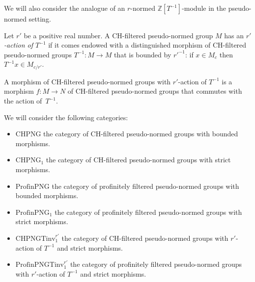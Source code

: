 We will also consider the analogue of an $r$-normed $\mathbb Z[T^{-1}]$-module in the pseudo-normed setting.

\begin{definition}
  \label{chpng-Tinv}
  \leanok
  Let $r'$ be a positive real number.
  A CH-filtered pseudo-normed group $M$
  has an \emph{$r'$-action of $T^{-1}$}
  if it comes endowed with a distinguished morphism of CH-filtered pseudo-normed groups
  $T^{-1} \colon M \to M$ that is bounded by $r'^{-1}$:
  if $x \in M_c$ then $T^{-1}x \in M_{c/r'}$.

  A morphism of CH-filtered pseudo-normed groups with $r'$-action of $T^{-1}$
  is a morphism $f \colon M \to N$ of CH-filtered pseudo-normed groups that commutes with the action of~$T^{-1}$.
\end{definition}

\begin{definition}
  \label{png-cats}
  We will consider the following categories:
  \begin{itemize}
    \item $\text{CHPNG}$ the category of CH-filtered pseudo-normed groups with bounded morphisms.
    \item $\text{CHPNG}_1$ the category of CH-filtered pseudo-normed groups with strict morphisms.
    \item $\text{ProfinPNG}$ the category of profinitely filtered pseudo-normed groups with bounded morphisms.
    \item $\text{ProfinPNG}_1$ the category of profinitely filtered pseudo-normed groups with strict morphisms.
    \item $\text{CHPNGTinv}_1^{r'}$ the category of CH-filtered pseudo-normed groups with $r'$-action of $T^{-1}$ and strict morphisms.
    \item $\text{ProfinPNGTinv}_1^{r'}$ the category of profinitely filtered pseudo-normed groups with $r'$-action of $T^{-1}$ and strict morphisms.
  \end{itemize}
\end{definition}

